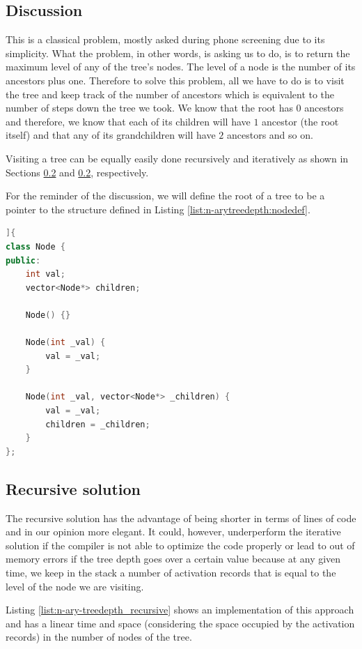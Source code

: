 \subsection{Discussion}
    This is a classical problem, mostly asked during phone screening due to its simplicity. 
    What the problem, in other words, is asking us to do, is to return the maximum level of any of the tree's nodes.
    The level of a node is the number of its ancestors plus one. 
    Therefore to solve this problem, all we have to do is to visit the tree and keep track of the number of ancestors which is equivalent to the number of steps down the tree we took.
    We know that the root has $0$ ancestors and therefore, we know that each of its children will have $1$ ancestor (the root itself) and that any of its grandchildren will have $2$ ancestors and so on.
    
    Visiting a tree can be equally easily done recursively and iteratively as shown in Sections \ref{} and \ref{}, respectively.
 
    For the reminder of the discussion, we will define the root of a tree to be a pointer to the  structure defined in Listing \ref{list:n-arytreedepth:nodedef}.
 
    \begin{lstlisting}[language=c++, caption={Node definition.},label=list:n-arytreedepth:nodedef]]{
class Node {
public:
    int val;
    vector<Node*> children;

    Node() {}

    Node(int _val) {
        val = _val;
    }

    Node(int _val, vector<Node*> _children) {
        val = _val;
        children = _children;
    }
};            
    \end{lstlisting} 
    

\subsection{Recursive solution}
The recursive solution has the advantage of being shorter in terms of lines of code and in our opinion more elegant. It could, however, underperform the iterative solution if the compiler is not able to optimize the code properly or lead to out of memory errors if the tree depth goes over a certain value because at any given time, we keep in the stack a number of activation records that is equal to the level of the node we are visiting.

Listing \ref{list:n-ary-treedepth_recursive}  shows an implementation of this approach and has a linear time and space (considering the space occupied by the activation records) in the number of nodes of the tree.

